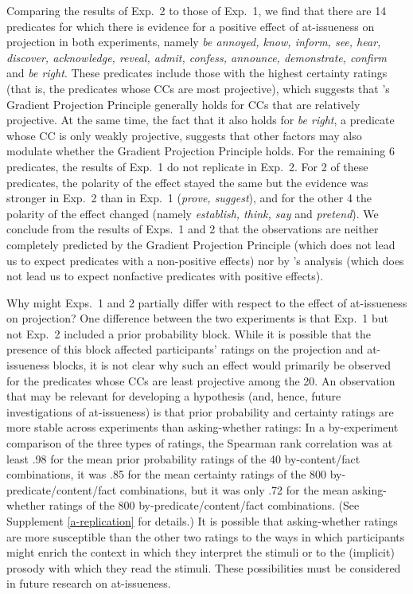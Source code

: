 \documentclass[11pt,fleqn]{article}
\newcommand{\6}{\mbox{$[\hspace*{-.6mm}[$}}
\newcommand{\9}{\mbox{$]\hspace*{-.6mm}]$}}
\newcommand{\citepos}[1]{\citeauthor{#1}'s \citeyear{#1}}
\begin{document}
Comparing the results of Exp.~2 to those of Exp.~1, we find that there are 14 predicates for which there is evidence for a positive effect of at-issueness on projection in both experiments, namely {\em be annoyed, know, inform, see, hear, discover, acknowledge, reveal, admit, confess, announce, demonstrate, confirm} and {\em be right}. These predicates include those with the highest certainty ratings (that is, the predicates whose CCs are most projective), which suggests that \citepos{tbd-variability} Gradient Projection Principle generally holds for CCs that are relatively projective. At the same time, the fact that it also holds for {\em be right}, a predicate whose CC is only weakly projective, suggests that other factors may also modulate whether the Gradient Projection Principle holds.  For the remaining 6 predicates, the results of Exp.~1 do not replicate in Exp.~2. For 2 of these predicates, the polarity of the effect stayed the same but the evidence was stronger in Exp.~2 than in Exp.~1 ({\em prove, suggest}), and for the other 4 the polarity of the effect changed (namely {\em establish, think, say} and {\em pretend}). We conclude from the results of Exps.~1 and 2 that the observations are neither completely predicted by the Gradient Projection Principle (which does not lead us to expect predicates with a non-positive effects) nor by \citepos{djaerv-bacovcin2020} analysis (which does not lead us to expect nonfactive predicates with positive effects).

Why might Exps.~1 and 2 partially differ with respect to the effect of at-issueness on projection? One difference between the two experiments is that Exp.~1 but not Exp.~2 included a prior probability block. While it is possible that the presence of this block affected participants' ratings on the projection and at-issueness blocks, it is not clear why such an effect would primarily be observed for the predicates whose CCs are least projective among the 20. An observation that may be relevant for developing a hypothesis (and, hence, future investigations of at-issueness) is that prior probability and certainty ratings are more stable across experiments than asking-whether ratings: In a by-experiment comparison of the three types of ratings, the Spearman rank correlation was at least .98 for the mean prior probability ratings of the 40 by-content/fact combinations, it was .85  for the mean certainty ratings of the 800 by-predicate/content/fact combinations, but it was only .72 for the mean asking-whether ratings of the 800 by-predicate/content/fact combinations. (See Supplement \ref{a-replication} for details.) It is possible that asking-whether ratings are more susceptible than the other two ratings to the ways in which participants might enrich the context in which they interpret the stimuli or to the (implicit) prosody with which they read the stimuli. These possibilities must be considered in future research on at-issueness.
\end{document}
